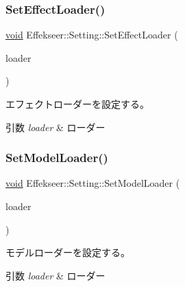 \subsubsection{\texorpdfstring{Set\+Effect\+Loader()}{SetEffectLoader()}}
{\footnotesize\ttfamily \mbox{\hyperlink{namespace_effekseer_ab34c4088e512200cf4c2716f168deb56}{void}} Effekseer\+::\+Setting\+::\+Set\+Effect\+Loader (\begin{DoxyParamCaption}\item[{\mbox{\hyperlink{class_effekseer_1_1_effect_loader}{Effect\+Loader}} $\ast$}]{loader }\end{DoxyParamCaption})}



エフェクトローダーを設定する。 


\begin{DoxyParams}{引数}
{\em loader} & ローダー \\
\hline
\end{DoxyParams}
\mbox{\label{class_effekseer_1_1_setting_a98982ad75809cd84b95865fc58fbd325}} 
\subsubsection{\texorpdfstring{Set\+Model\+Loader()}{SetModelLoader()}}
{\footnotesize\ttfamily \mbox{\hyperlink{namespace_effekseer_ab34c4088e512200cf4c2716f168deb56}{void}} Effekseer\+::\+Setting\+::\+Set\+Model\+Loader (\begin{DoxyParamCaption}\item[{\mbox{\hyperlink{class_effekseer_1_1_model_loader}{Model\+Loader}} $\ast$}]{loader }\end{DoxyParamCaption})}



モデルローダーを設定する。 


\begin{DoxyParams}{引数}
{\em loader} & ローダー \\
\hline
\end{DoxyParams}
\mbox{\label{class_effekseer_1_1_setting_a7f383e108785141004f9ed4008ae6b20}} 
